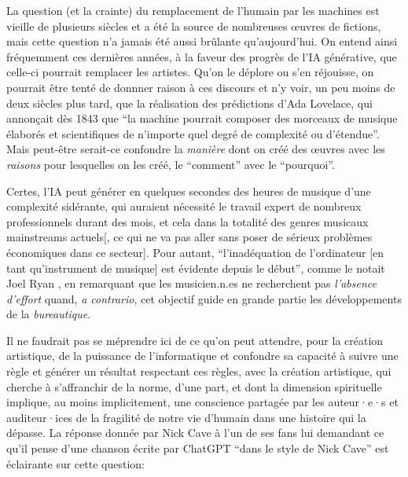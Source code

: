 La question (et la crainte) du remplacement de l'humain par les machines est vieille de plusieurs siècles et a été la source de nombreuses œuvres de fictions,
mais cette question n'a jamais été aussi brûlante qu'aujourd'hui. On entend ainsi fréquemment ces dernières années, à la faveur des progrès de l'IA générative, que celle-ci pourrait 
remplacer les artistes. Qu'on le déplore ou s'en réjouisse, on pourrait être tenté de donnner raison à ces discours et n'y voir, un peu moins de deux siècles plus tard, que la réalisation des prédictions d'Ada Lovelace, qui annonçait dès 1843 que ``la machine pourrait composer des morceaux de musique élaborés et scientifiques de n’importe quel degré de complexité ou d’étendue''\cite{lovelace_translators_1843}. Mais peut-être serait-ce confondre la \textit{manière} dont on créé des œuvres avec les \textit{raisons} pour lesquelles on les créé, le ``comment'' avec le ``pourquoi''.

Certes, l'IA peut générer en quelques secondes des heures de musique d'une complexité sidérante, qui auraient nécessité le travail expert de nombreux professionnels durant des mois, et cela dans la totalité des genres musicaux mainstreams actuels[, ce qui ne va pas aller sans poser de sérieux problèmes économiques dans ce secteur]. Pour autant, ``l'inadéquation de l'ordinateur [en tant qu'instrument de musique] est évidente depuis le début'', comme le notait Joel Ryan \cite{ryan_remarks_1991}, en remarquant que les musicien.n.es ne recherchent pas \textit{l'absence d'effort} quand, \textit{a contrario}, cet objectif guide en grande partie les développements de la \textit{bureautique}.

Il ne faudrait pas se méprendre ici de ce qu'on peut attendre, pour la création artistique, de la puissance de l'informatique et confondre sa capacité à suivre une règle et générer un résultat respectant ces règles, avec la création artistique, qui cherche à s'affranchir de la norme, d'une part, et dont la dimension spirituelle implique, au moins implicitement, une conscience partagée par les auteur·e·s et auditeur·ices de la fragilité de notre vie d'humain dans une histoire qui la dépasse. La réponse donnée par Nick Cave à l'un de ses fans lui demandant ce qu'il pense d'une chanson écrite par ChatGPT ``dans le style de Nick Cave'' est éclairante sur cette question:

